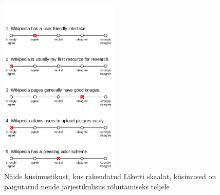 \documentclass[a4paper]{article}
\begin{document}
\begin{figure}[H]
\centering
\includegraphics[width=0.5\textwidth, height = 0.7\textwidth]{Example_Likert_Scale.png}
\caption{Näide k\"usimustikust, kus rakendatud Likerti skaalat, k\"usimused on paigutatud nende järjestikulisus rõhutamiseks teljele\cite{Smith}}
\label{likert2}
\end{figure}



\pagebreak
{}

\end{document}
